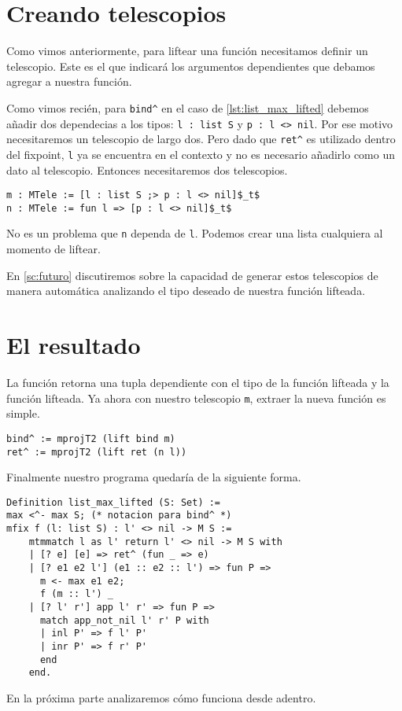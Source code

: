 \section{Creando telescopios}

Como vimos anteriormente, para liftear una función necesitamos definir un telescopio. Este es el que indicará los argumentos dependientes que debamos agregar a nuestra función.

Como vimos recién, para \lstinline{bind^} en el caso de \ref{lst:list_max_lifted} debemos añadir dos dependecias a los tipos: \lstinline{l : list S} y \lstinline{p : l <> nil}.
Por ese motivo necesitaremos un telescopio de largo dos.
Pero dado que \lstinline{ret^} es utilizado dentro del fixpoint, \lstinline{l} ya se encuentra en el contexto y no es necesario añadirlo como un dato al telescopio. Entonces necesitaremos dos telescopios.

\begin{lstlisting}[frame=tb,caption={Telescopio para \lstinline{list_max}},label=lst:list_max_tele]
m : MTele := [l : list S ;> p : l <> nil]$_t$
n : MTele := fun l => [p : l <> nil]$_t$
\end{lstlisting}

No es un problema que \lstinline{n} dependa de \lstinline{l}. Podemos crear una lista cualquiera al momento de liftear.

En \ref{sc:futuro} discutiremos sobre la capacidad de generar estos telescopios de manera automática analizando el tipo deseado de nuestra función lifteada.

\section{El resultado}

La función \lift retorna una tupla dependiente con el tipo de la función lifteada y la función lifteada. Ya ahora con nuestro telescopio \lstinline{m}, extraer la nueva función es simple.

\begin{lstlisting}[float=h,frame=tb,caption={Lifteando \lstinline{ret} y \lstinline{bind}}]
bind^ := mprojT2 (lift bind m)
ret^ := mprojT2 (lift ret (n l))
\end{lstlisting}

Finalmente nuestro programa quedaría de la siguiente forma.

\begin{lstlisting}[float=h,frame=tb,caption={Lifteando \lstinline{ret} y \lstinline{bind}}]
Definition list_max_lifted (S: Set) :=
max <^- max S; (* notacion para bind^ *)
mfix f (l: list S) : l' <> nil -> M S :=
    mtmmatch l as l' return l' <> nil -> M S with
    | [? e] [e] => ret^ (fun _ => e)
    | [? e1 e2 l'] (e1 :: e2 :: l') => fun P =>
      m <- max e1 e2;
      f (m :: l') _
    | [? l' r'] app l' r' => fun P =>
      match app_not_nil l' r' P with
      | inl P' => f l' P'
      | inr P' => f r' P'
      end
    end.
\end{lstlisting}

En la próxima parte analizaremos cómo funciona \lift desde adentro.